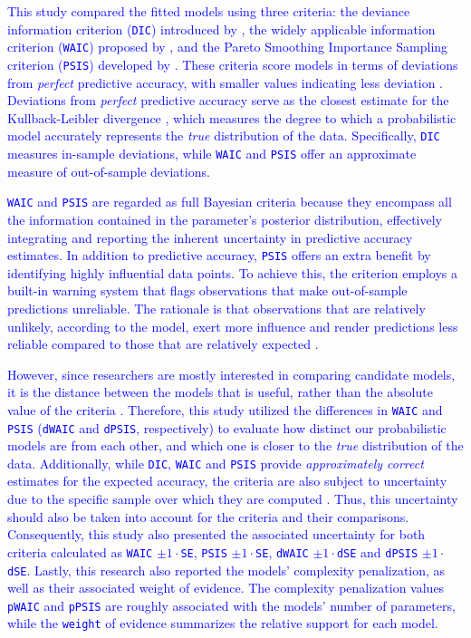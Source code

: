 \documentclass[
  authoryear,
  preprint,
  1p]{elsarticle}
\begin{document}
\textcolor{blue}{This study compared the fitted models using three criteria: the
deviance information criterion (\texttt{DIC}) introduced by
\citet{Spiegelhalter_et_al_2002}, the widely applicable information
criterion (\texttt{WAIC}) proposed by \citet{Watanabe_2013}, and the
Pareto Smoothing Importance Sampling criterion (\texttt{PSIS}) developed
by \citet{Vehtari_et_al_2017}. These criteria score models in terms of
deviations from \emph{perfect} predictive accuracy, with smaller values
indicating less deviation \citep{McElreath_2020}. Deviations from
\emph{perfect} predictive accuracy serve as the closest estimate for the
Kullback-Leibler divergence \citep{Kullback_et_al_1951}, which measures
the degree to which a probabilistic model accurately represents the
\emph{true} distribution of the data. Specifically, \texttt{DIC}
measures in-sample deviations, while \texttt{WAIC} and \texttt{PSIS}
offer an approximate measure of out-of-sample deviations.}

\textcolor{blue}{\texttt{WAIC} and \texttt{PSIS} are regarded as full Bayesian criteria
because they encompass all the information contained in the parameter's
posterior distribution, effectively integrating and reporting the
inherent uncertainty in predictive accuracy estimates. In addition to
predictive accuracy, \texttt{PSIS} offers an extra benefit by
identifying highly influential data points. To achieve this, the
criterion employs a built-in warning system that flags observations that
make out-of-sample predictions unreliable. The rationale is that
observations that are relatively unlikely, according to the model, exert
more influence and render predictions less reliable compared to those
that are relatively expected \citep{McElreath_2020}.}

\textcolor{blue}{However, since researchers are mostly interested in comparing candidate
models, it is the distance between the models that is useful, rather
than the absolute value of the criteria \citep[see][pp.~209,
223-224]{McElreath_2020}. Therefore, this study utilized the differences
in \texttt{WAIC} and \texttt{PSIS} (\texttt{dWAIC} and \texttt{dPSIS},
respectively) to evaluate how distinct our probabilistic models are from
each other, and which one is closer to the \emph{true} distribution of
the data. Additionally, while \texttt{DIC}, \texttt{WAIC} and
\texttt{PSIS} provide \emph{approximately correct} estimates for the
expected accuracy, the criteria are also subject to uncertainty due to
the specific sample over which they are computed
\citep[see][pp.~223]{McElreath_2020}. Thus, this uncertainty should also
be taken into account for the criteria and their comparisons.
Consequently, this study also presented the associated uncertainty for
both criteria calculated as \texttt{WAIC} \(\pm 1 \cdot\)\texttt{SE},
\texttt{PSIS} \(\pm 1 \cdot\)\texttt{SE}, \texttt{dWAIC}
\(\pm 1 \cdot\)\texttt{dSE} and \texttt{dPSIS}
\(\pm 1 \cdot\)\texttt{dSE}. Lastly, this research also reported the
models' complexity penalization, as well as their associated weight of
evidence. The complexity penalization values \texttt{pWAIC} and
\texttt{pPSIS} are roughly associated with the models' number of
parameters, while the \texttt{weight} of evidence summarizes the
relative support for each model.}
\end{document}
